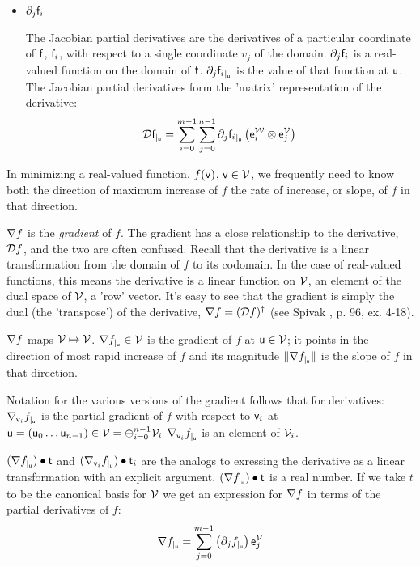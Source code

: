 \begin{itemize}
\item ${\partial}_{j}{\mathsf{f}_i}$

The Jacobian partial derivatives are the derivatives of
a particular coordinate of $\mathsf{f}$, $\mathsf{f}_i$, with respect to
a single coordinate $v_j$ of the domain.
${\partial}_{j}{\mathsf{f}_i}$ is a real-valued function on the domain of $\mathsf{f}$.
${\partial}_{j}{\mathsf{f}_i}_{\mid_{\mathsf{u}}}$ is the value of that function at $\mathsf{u}$.
The Jacobian partial derivatives form the 'matrix' representation of the derivative:
\begin{equation}
{\mathcal{D}{\mathsf{f}}_{\mid_{\mathsf{u}}}} =
\sum_{i=0}^{m-1}
\sum_{j=0}^{n-1}
{\partial}_{j}{\mathsf{f}_i}_{\mid_{\mathsf{u}}} \left( \mathsf{e}_i^{\mathcal{W}} \otimes \mathsf{e}_j^{\mathcal{V}} \right)
\end{equation}

\end{itemize}

In minimizing a real-valued function, $f(\mathsf{v})$, $\mathsf{v} \in \mathcal{V}$,
we frequently need to know both the direction of maximum increase of $f$
the rate of increase, or slope, of $f$ in that direction.

${\mathbf \nabla}{f}$ is the {\it gradient} of $f$.
The gradient has a close relationship to the derivative, ${\mathcal{D}{f}}$,
and the two are often confused.
Recall that the derivative is a linear transformation
from the domain of $f$ to its codomain.
In the case of real-valued functions,
this means the derivative is a linear function on $\mathcal{V}$,
an element of the dual space of $\mathcal{V}$, a 'row' vector.
It's easy to see that the gradient is simply the dual (the 'transpose')
of the derivative, ${\mathbf \nabla}{f} = ({\mathcal{D}{f}})^{\dagger}$
(see Spivak \cite{spivak-1965}, p. 96, ex. 4-18).

${\mathbf \nabla}{f}$ maps $\mathcal{V} \mapsto \mathcal{V}$.
${\mathbf \nabla}{f}_{\mid_{\mathsf{u}}} \in \mathcal{V}$ is the gradient of $f$ at $\mathsf{u} \in \mathcal{V}$;
it points in the direction of most rapid increase of
$f$ and its magnitude $\| {\mathbf \nabla}{f}_{\mid_{\mathsf{u}}} \|$ is the
slope of $f$ in that direction.

Notation for the various versions of the gradient
follows that for derivatives:
${\mathbf \nabla}_{\mathsf{v}_i}{{f}}_{\mid_{\mathsf{u}}}$ is the partial gradient of $f$ with respect to $\mathsf{v}_i$ at
$\mathsf{u} = \left( \mathsf{u}_0 \ldots \mathsf{u}_{n-1} \right) \in \mathcal{V} = \oplus_{i=0}^{n-1} \mathcal{V}_i$
${\mathbf \nabla}_{\mathsf{v}_i}{{f}}_{\mid_{\mathsf{u}}}$ is an element of $\mathcal{V}_i$.

$({\mathbf \nabla}{f}_{\mid_{\mathsf{u}}}) \bullet  \mathsf{t}$
and
$({\mathbf \nabla}_{\mathsf{v}_i}{{f}}_{\mid_{\mathsf{u}}}) \bullet \mathsf{t}_i$
are the analogs to exressing the derivative as a linear transformation
with an explicit argument.
$({\mathbf \nabla}{f}_{\mid_{\mathsf{u}}}) \bullet  \mathsf{t}$ is a real number.
If we take $t$ to be the canonical basis for $\mathcal{V}$
we get an expression for ${\mathbf \nabla}{f}$ in terms of the partial derivatives of $f$:
\begin{equation}
\label{eq:gradient-from-partials}
{\mathbf \nabla}{f}_{\mid_{\mathsf{u}}} = \sum_{j=0}^{m-1} \left( {\partial}_{j}{f}_{\mid_{\mathsf{u}}} \right) \mathsf{e}_j^{\mathcal{V}}
\end{equation}

